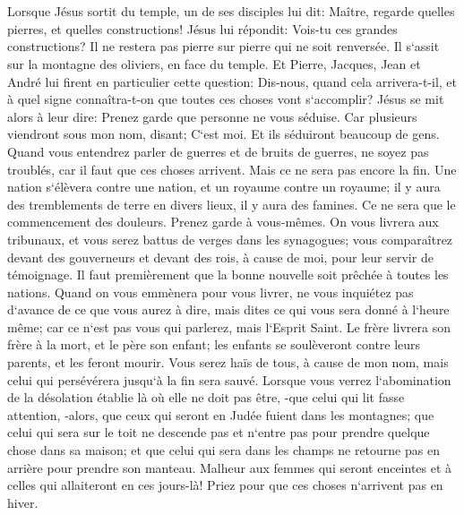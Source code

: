 \chapter{}

\verse Lorsque Jésus sortit du temple, un de ses disciples lui dit: Maître, regarde quelles pierres, et quelles constructions! 
\verse Jésus lui répondit: Vois-tu ces grandes constructions? Il ne restera pas pierre sur pierre qui ne soit renversée. 
\verse Il s`assit sur la montagne des oliviers, en face du temple. Et Pierre, Jacques, Jean et André lui firent en particulier cette question: 
\verse Dis-nous, quand cela arrivera-t-il, et à quel signe connaîtra-t-on que toutes ces choses vont s`accomplir? 
\verse Jésus se mit alors à leur dire: Prenez garde que personne ne vous séduise. 
\verse Car plusieurs viendront sous mon nom, disant; C`est moi. Et ils séduiront beaucoup de gens. 
\verse Quand vous entendrez parler de guerres et de bruits de guerres, ne soyez pas troublés, car il faut que ces choses arrivent. Mais ce ne sera pas encore la fin. 
\verse Une nation s`élèvera contre une nation, et un royaume contre un royaume; il y aura des tremblements de terre en divers lieux, il y aura des famines. Ce ne sera que le commencement des douleurs. 
\verse Prenez garde à vous-mêmes. On vous livrera aux tribunaux, et vous serez battus de verges dans les synagogues; vous comparaîtrez devant des gouverneurs et devant des rois, à cause de moi, pour leur servir de témoignage. 
\verse Il faut premièrement que la bonne nouvelle soit prêchée à toutes les nations. 
\verse Quand on vous emmènera pour vous livrer, ne vous inquiétez pas d`avance de ce que vous aurez à dire, mais dites ce qui vous sera donné à l`heure même; car ce n`est pas vous qui parlerez, mais l`Esprit Saint. 
\verse Le frère livrera son frère à la mort, et le père son enfant; les enfants se soulèveront contre leurs parents, et les feront mourir. 
\verse Vous serez haïs de tous, à cause de mon nom, mais celui qui persévérera jusqu`à la fin sera sauvé. 
\verse Lorsque vous verrez l`abomination de la désolation établie là où elle ne doit pas être, -que celui qui lit fasse attention, -alors, que ceux qui seront en Judée fuient dans les montagnes; 
\verse que celui qui sera sur le toit ne descende pas et n`entre pas pour prendre quelque chose dans sa maison; 
\verse et que celui qui sera dans les champs ne retourne pas en arrière pour prendre son manteau. 
\verse Malheur aux femmes qui seront enceintes et à celles qui allaiteront en ces jours-là! 
\verse Priez pour que ces choses n`arrivent pas en hiver. 
